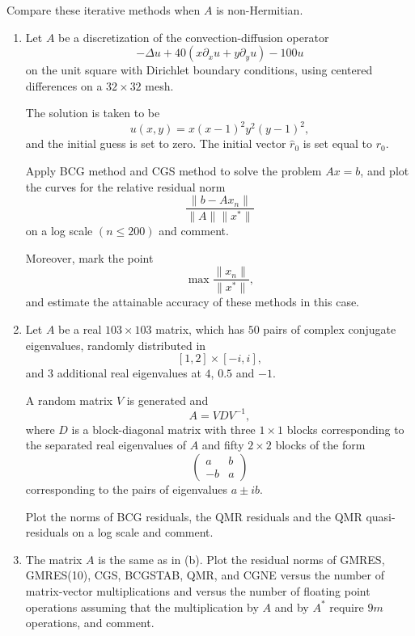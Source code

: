 \documentclass{ctexart}
\begin{document}
\begin{problem}\label{pro:4}
  Compare these iterative methods when $A$ is non-Hermitian.

  \begin{enumerate}[label=(\alph*)]

    \item
      Let $A$ be a discretization of the convection-diffusion operator
      \[
        -\Delta u +40(x\partial_x u+y\partial_y u)-100u
      \]
      on the unit square with Dirichlet boundary conditions, using centered differences on a $32\times32$ mesh.

      The solution is taken to be
      \[
        u(x,y)=x(x-1)^2y^2(y-1)^2,
      \]
      and the initial guess is set to zero. The initial vector $\hat r_0$ is set equal to $r_0$.

      Apply BCG method and CGS method to solve the problem $Ax=b$, and plot the curves for the relative residual norm
      \[
        \frac{\|b-Ax_n\|}{\|A\|\|x^*\|}
      \]
      on a log scale $(n\le 200)$ and comment.

      Moreover, mark the point
      \[
        \max \frac{\|x_n\|}{\|x^*\|},
      \]
      and estimate the attainable accuracy of these methods in this case.

    \item
      Let $A$ be a real $103\times103$ matrix, which has $50$ pairs of complex conjugate eigenvalues, randomly distributed in
      \[
        [1,2]\times[-i,i],
      \]
      and $3$ additional real eigenvalues at $4$, $0.5$ and $-1$.

      A random matrix $V$ is generated and
      \[
        A=VDV^{-1},
      \]
      where $D$ is a block-diagonal matrix with three $1\times1$ blocks corresponding to the separated real eigenvalues of $A$ and fifty $2\times2$ blocks of the form
      \[
        \begin{pmatrix}
          a & b\\
          -b & a
        \end{pmatrix}
      \]
      corresponding to the pairs of eigenvalues $a\pm ib$.

      Plot the norms of BCG residuals, the QMR residuals and the QMR quasi-residuals on a log scale and comment.

    \item
      The matrix $A$ is the same as in (b). Plot the residual norms of GMRES, GMRES(10), CGS, BCGSTAB, QMR, and CGNE versus the number of matrix-vector multiplications and versus the number of floating point operations assuming that the multiplication by $A$ and by $A^*$ require $9m$ operations, and comment.

  \end{enumerate}
\end{problem}
\end{document}
